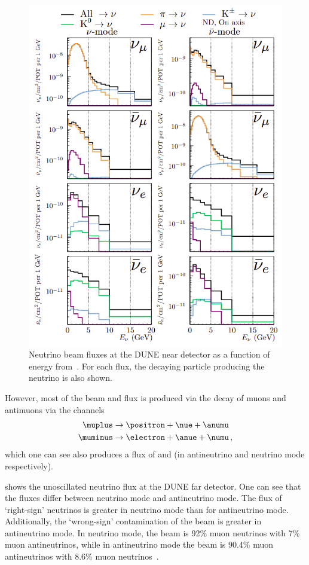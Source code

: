 \begin{figure}[h]
  \centering
  \includegraphics[width=.9\linewidth]{files/figures/dune_detector/duneNDFlux}
  \caption[Neutrino beam fluxes at the DUNE near detector as a function of neutrino energy.]{Neutrino beam fluxes at the DUNE near detector as a function of energy from~\cite{tdrVol2}. For each flux, the decaying particle producing the neutrino is also shown.}
  \label{fig:ndFluxes}
\end{figure}

However, most of the beam \nue and \anue flux is produced via the decay of muons and antimuons via the channels
\begin{align}
  \muplus &\rightarrow \positron + \nue + \anumu \\
  \muminus &\rightarrow \electron + \anue + \numu \, ,
\end{align}
which one can see also produces a flux of \numu and \anumu (in antineutrino and neutrino mode respectively).

 shows the unoscillated neutrino flux at the DUNE far detector.
One can see that the fluxes differ between neutrino mode and antineutrino mode.
The flux of `right-sign' neutrinos is greater in neutrino mode than for antineutrino mode.
Additionally, the `wrong-sign' contamination of the beam is greater in antineutrino mode.
In neutrino mode, the beam is 92\% muon neutrinos with 7\% muon antineutrinos, while in antineutrino mode the beam is 90.4\% muon antineutrinos with 8.6\% muon neutrinos~\cite{tdrVol2}.

